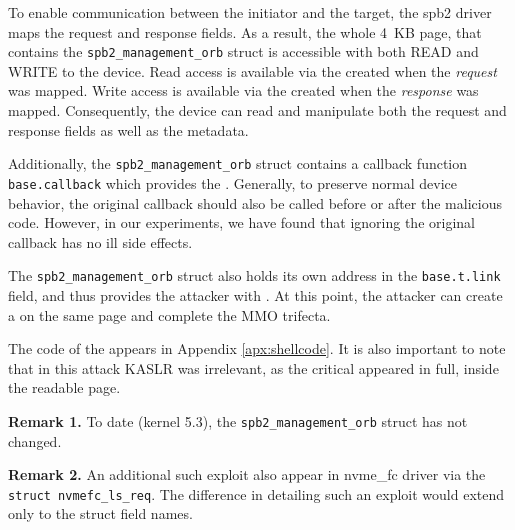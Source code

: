 To enable communication between the initiator and the target, the spb2 driver maps the request and response fields. As a result, the whole 4~KB page, that contains the \texttt{spb2\_management\_orb} struct is accessible with both READ and WRITE to the device. Read access is available via the \iova{} created when the \emph{request} was mapped. Write access is available via the \iova{} created when the \emph{response} was mapped. Consequently, the device can read and manipulate both the request and response fields as well as the metadata. 

Additionally, the \texttt{spb2\_management\_orb} struct contains a callback function \texttt{base.callback} which provides the \oportunity{}. Generally, to preserve normal device behavior, the original callback should also be called before or after the malicious code. However, in our experiments, we have found that ignoring the original callback has no ill side effects. 

The \texttt{spb2\_management\_orb} struct also holds its own address in the \texttt{base.t.link} field, and thus provides the attacker with \means{}. At this point, the attacker can create a \mabaf{} on the same page and complete the MMO trifecta. 

The code of the \mabaf{} appears in Appendix \ref{apx:shellcode}. It is also important to note that in this attack KASLR was irrelevant, as the critical \kva{} appeared in full, inside the readable page.

\smallskip
\noindent \textbf{Remark 1.} To date (kernel 5.3), the \texttt{spb2\_management\_orb} struct has not changed.

\smallskip
\noindent\textbf{Remark 2.} An additional such exploit also appear in nvme\_fc driver via the \texttt{struct nvmefc\_ls\_req}. The difference in detailing such an exploit would extend only to the struct field names.